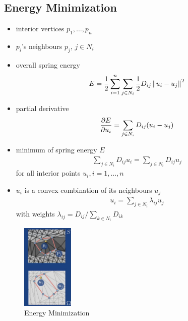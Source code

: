 \subsection{Energy Minimization}
\begin{itemize}
    \item interior vertices $p_1,\dots,p_n$
    \item $p_i$'s neighbours $p_j$, $j\in N_i$
    \item overall spring energy
    \begin{align*}
        E=\frac{1}{2}\sum_{i=1}^n\sum_{j\in N_i}\frac{1}{2}D_{ij}\left\lVert u_i-u_j\right\rVert^2
    \end{align*}
    \item partial derivative
    \begin{align*}
        \frac{\partial E}{\partial u_i}=\sum_{j\in N_i}D_{ij}(u_i-u_j)
    \end{align*}
    \item minimum of spring energy $E$
    \begin{align*}
        \sum_{j\in N_i}D_{ij}u_i=\sum_{j\in N_i}D_{ij}u_j
    \end{align*}
    for all interior points $u_i, i=1,\dots,n$
    \item $u_i$ is a convex combination of its neighbours $u_j$
    \begin{align*}
        u_i=\sum_{j\in N_i}\lambda_{ij}u_j
    \end{align*}
    with weights $\displaystyle \lambda_{ij}=D_{ij}\bigg/ \sum_{k\in N_i}D_{ik}$
\end{itemize}

\begin{figure}[!htb]
    \centering
    \includegraphics[width=0.22\textwidth]{pic/ACG2/Energy Minimization}
    \caption{Energy Minimization}
\end{figure}


